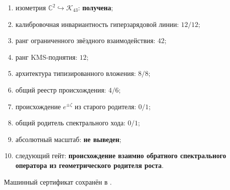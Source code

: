 \begin{protocol}\begin{enumerate}
\item изометрия $\mathbb C^2\hookrightarrow\mathcal K_{43}$:
\textbf{получена};
\item калибровочная инвариантность гиперзарядовой линии: \textbf{$12/12$};
\item ранг ограниченного звёздного взаимодействия: \textbf{$42$};
\item ранг KMS-поднятия: \textbf{$12$};
\item архитектура типизированного вложения: \textbf{$8/8$};
\item общий реестр происхождения: \textbf{$4/6$};
\item происхождение $e^{\pm\zeta}$ из старого родителя: \textbf{$0/1$};
\item общий родитель спектрального хода: \textbf{$0/1$};
\item абсолютный масштаб: \textbf{не выведен};
\item следующий гейт: \textbf{происхождение взаимно обратного
спектрального оператора из геометрического родителя роста}.
\end{enumerate}\end{protocol}

Машинный сертификат сохранён в
.